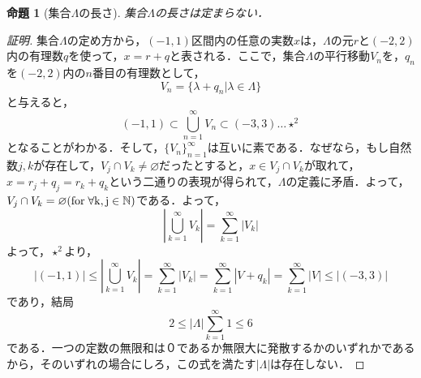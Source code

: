 \documentclass[uplatex, 12pt, a4paper]{jsarticle}
\newtheorem{proposition}{命題}
\begin{document}
\begin{shadebox}\begin{proposition}[集合$\Lambda$の長さ]集合$\Lambda$の長さは定まらない．\end{proposition}\end{shadebox}
\begin{proof}[証明]
集合$\Lambda$の定め方から，$(-1,1)$区間内の任意の実数$x$は，$\Lambda$の元$r$と$(-2,2)$内の有理数$q$を使って，$x=r+q$と表される．ここで，集合$\Lambda$の平行移動$V_n$を，$q_n$を$(-2,2)$内の$n$番目の有理数として，$$V_n = \{ \lambda+q_n | \lambda \in \Lambda \}$$
と与えると，$$(-1,1) \subset \bigcup^{\infty}_{n=1}V_n \subset (-3,3) \dots \star^2$$となることがわかる．そして，$\{V_n\}^{\infty}_{n=1}$は互いに素である．なぜなら，もし自然数$j,k$が存在して，$V_j \cap V_k \neq \varnothing$だったとすると，$x \in V_j \cap V_k$が取れて，$x=r_j+q_j=r_k+q_k$という二通りの表現が得られて，$\Lambda$の定義に矛盾．よって，$V_j \cap V_k = \varnothing (\rm{for} \hspace{1mm} \forall k,j \in \mathbb{N})$である．よって，$$\left| \bigcup^{\infty}_{k=1}V_k \right| = \sum^{\infty}_{k=1}|V_k|$$よって，$\star^2$より，$$|(-1,1)| \leq \left| \bigcup^{\infty}_{k=1}V_k \right| = \sum^{\infty}_{k=1}|V_k| = \sum^{\infty}_{k=1}|V+q_k| = \sum^{\infty}_{k=1}|V| \leq |(-3,3)| $$であり，結局$$2 \leq |\Lambda| \sum^{\infty}_{k=1} 1 \leq 6$$である．一つの定数の無限和は０であるか無限大に発散するかのいずれかであるから，そのいずれの場合にしろ，この式を満たす$|\Lambda|$は存在しない．
\end{proof}
\end{document}
